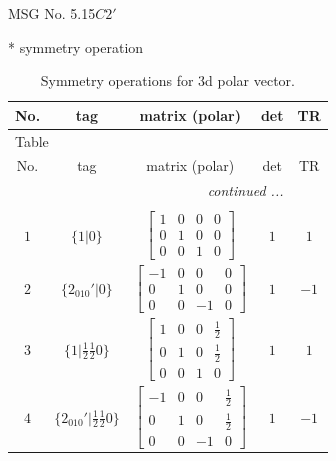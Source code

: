 \documentclass[fleqn,8pt]{jsarticle}
\begin{document}
\setcounter{MaxMatrixCols}{32}

\renewcommand{\tablename}{Table~}
\renewcommand{\figurename}{Figure~}
\begin{center}
\LARGE
MSG No. 5.15\quad$C2'$
\end{center}
* symmetry operation
\renewcommand{\arraystretch}{1.3}
\begin{longtable}{ccccc}
\caption{Symmetry operations for 3d polar vector.}
 \\
 \hline \hline
No. & tag & matrix (polar) & det & TR \\ \hline \endfirsthead

\multicolumn{4}{l}{\tablename\ \thetable{}} \\
 \hline \hline
No. & tag & matrix (polar) & det & TR \\ \hline \endhead

 \hline \hline
\multicolumn{4}{r}{\footnotesize\it continued ...} \\ \endfoot

 \hline \hline
\multicolumn{4}{r}{} \\ \endlastfoot

$ 1 $ & $ \{1|0\} $ & $ \begin{bmatrix} 1 & 0 & 0 & 0 \\ 0 & 1 & 0 & 0 \\ 0 & 0 & 1 & 0 \end{bmatrix} $ & $ 1 $ & $ 1 $ \\ \hline
$ 2 $ & $ \{2{}_{010}{}'|0\} $ & $ \begin{bmatrix} -1 & 0 & 0 & 0 \\ 0 & 1 & 0 & 0 \\ 0 & 0 & -1 & 0 \end{bmatrix} $ & $ 1 $ & $ -1 $ \\ \hline
$ 3 $ & $ \{1|\frac{1}{2} \frac{1}{2} 0\} $ & $ \begin{bmatrix} 1 & 0 & 0 & \frac{1}{2} \\ 0 & 1 & 0 & \frac{1}{2} \\ 0 & 0 & 1 & 0 \end{bmatrix} $ & $ 1 $ & $ 1 $ \\ \hline
$ 4 $ & $ \{2{}_{010}{}'|\frac{1}{2} \frac{1}{2} 0\} $ & $ \begin{bmatrix} -1 & 0 & 0 & \frac{1}{2} \\ 0 & 1 & 0 & \frac{1}{2} \\ 0 & 0 & -1 & 0 \end{bmatrix} $ & $ 1 $ & $ -1 $ \\
\end{longtable}
\end{document}
